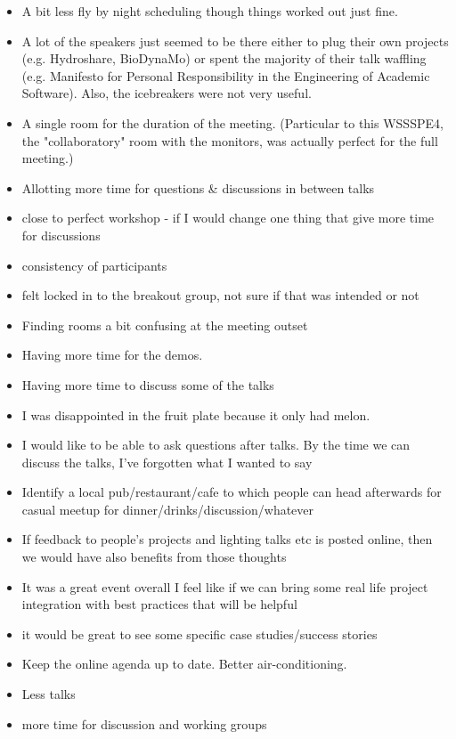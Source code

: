 \begin{itemize}
\item A bit less fly by night scheduling though things worked out just fine.  
\item A lot of the speakers just seemed to be there either to plug their own projects (e.g. Hydroshare, BioDynaMo) or spent the majority of their talk waffling (e.g. Manifesto for Personal Responsibility in the Engineering of Academic Software). Also, the icebreakers were not very useful.
\item A single room for the duration of the meeting. (Particular to this WSSSPE4, the "collaboratory" room with the monitors, was actually perfect for the full meeting.)
\item Allotting more time for questions \& discussions in between talks
\item close to perfect workshop - if I would change one thing that give more time for discussions
\item consistency of participants
\item felt locked in to the breakout group, not sure if that was intended or not
\item Finding rooms a bit confusing at the meeting outset
\item Having more time for the demos.
\item Having more time to discuss some of the talks
\item I was disappointed in the fruit plate because it only had melon.
\item I would like to be able to ask questions after talks. By the time we can discuss the talks, I've forgotten what I wanted to say
\item Identify a local pub/restaurant/cafe to which people can head afterwards for casual meetup for dinner/drinks/discussion/whatever
\item If feedback to people's projects and lighting talks etc is posted online, then we would have also benefits from those thoughts
\item It was a great event overall I feel like if we can bring some real life project integration with best practices that will be helpful 
\item it would be great to see some specific case studies/success stories
\item Keep the online agenda up to date. Better air-conditioning.
\item Less talks
\item more time for discussion and working groups

\end{itemize}
